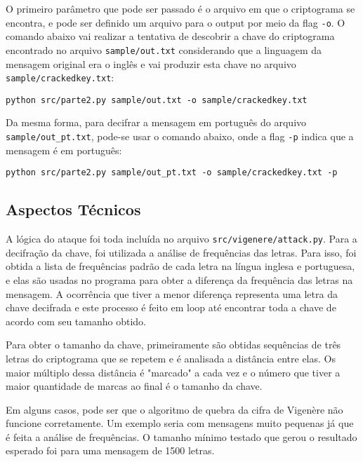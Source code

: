 \documentclass[12pt]{article}
\begin{document}
O primeiro parâmetro que pode ser passado é o arquivo em que o criptograma se encontra, e pode ser definido um arquivo para o output por meio da flag \texttt{-o}. O comando abaixo vai realizar a tentativa de descobrir a chave do criptograma encontrado no arquivo \texttt{sample/out.txt} considerando que a linguagem da mensagem original era o inglês e vai produzir esta chave no arquivo \texttt{sample/crackedkey.txt}:

\begin{lstlisting}
python src/parte2.py sample/out.txt -o sample/crackedkey.txt
\end{lstlisting}

Da mesma forma, para decifrar a mensagem em português do arquivo \texttt{sample/out\_pt.txt}, pode-se usar o comando abaixo, onde a flag \texttt{-p} indica que a mensagem é em português:

\begin{lstlisting}
python src/parte2.py sample/out_pt.txt -o sample/crackedkey.txt -p
\end{lstlisting}

\subsection{Aspectos Técnicos}
A lógica do ataque foi toda incluída no arquivo \texttt{src/vigenere/attack.py}. Para a decifração da chave, foi utilizada a análise de frequências das letras. Para isso, foi obtida a lista de frequências padrão de cada letra na língua inglesa e portuguesa, e elas são usadas no programa para obter a diferença da frequência das letras na mensagem. A ocorrência que tiver a menor diferença representa uma letra da chave decifrada e este processo é feito em loop até encontrar toda a chave de acordo com seu tamanho obtido.

Para obter o tamanho da chave, primeiramente são obtidas sequências de três letras do criptograma que se repetem e é analisada a distância entre elas. Os maior múltiplo dessa distância é "marcado" a cada vez e o número que tiver a maior quantidade de marcas ao final é o tamanho da chave.

Em alguns casos, pode ser que o algoritmo de quebra da cifra de Vigenère não funcione corretamente. Um exemplo seria com mensagens muito pequenas já que é feita a análise de frequências. O tamanho mínimo testado que gerou o resultado esperado foi para uma mensagem de 1500 letras.
\end{document}
